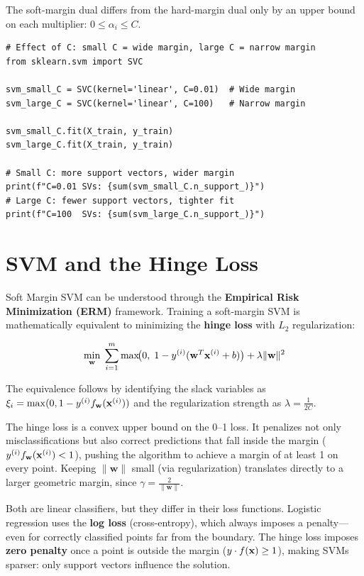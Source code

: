 The soft-margin dual differs from the hard-margin dual only by an upper bound on each multiplier: $0 \leq \alpha_i \leq C$.

\begin{lstlisting}[style=pythonstyle]
# Effect of C: small C = wide margin, large C = narrow margin
from sklearn.svm import SVC

svm_small_C = SVC(kernel='linear', C=0.01)  # Wide margin
svm_large_C = SVC(kernel='linear', C=100)   # Narrow margin

svm_small_C.fit(X_train, y_train)
svm_large_C.fit(X_train, y_train)

# Small C: more support vectors, wider margin
print(f"C=0.01 SVs: {sum(svm_small_C.n_support_)}")
# Large C: fewer support vectors, tighter fit
print(f"C=100  SVs: {sum(svm_large_C.n_support_)}")
\end{lstlisting}

\section*{SVM and the Hinge Loss}

Soft Margin SVM can be understood through the \textbf{Empirical Risk Minimization (ERM)} framework. Training a soft-margin SVM is mathematically equivalent to minimizing the \textbf{hinge loss} with $L_2$ regularization:

$$\min_{\mathbf{w}} \;\sum_{i=1}^{m} \max\!\bigl(0,\; 1 - y^{(i)}(\mathbf{w}^T\mathbf{x}^{(i)} + b)\bigr) + \lambda \|\mathbf{w}\|^2$$

The equivalence follows by identifying the slack variables as $\xi_i = \max(0, 1 - y^{(i)} f_{\mathbf{w}}(\mathbf{x}^{(i)}))$ and the regularization strength as $\lambda = \frac{1}{2C}$.

\begin{remark}
The hinge loss is a convex upper bound on the 0--1 loss. It penalizes not only misclassifications but also correct predictions that fall inside the margin ($y^{(i)} f_{\mathbf{w}}(\mathbf{x}^{(i)}) < 1$), pushing the algorithm to achieve a margin of at least 1 on every point. Keeping $\|\mathbf{w}\|$ small (via regularization) translates directly to a larger geometric margin, since $\gamma = \frac{2}{\|\mathbf{w}\|}$.
\end{remark}

\begin{remark}
Both are linear classifiers, but they differ in their loss functions. Logistic regression uses the \textbf{log loss} (cross-entropy), which always imposes a penalty---even for correctly classified points far from the boundary. The hinge loss imposes \textbf{zero penalty} once a point is outside the margin ($y \cdot f(\mathbf{x}) \geq 1$), making SVMs sparser: only support vectors influence the solution.
\end{remark}

